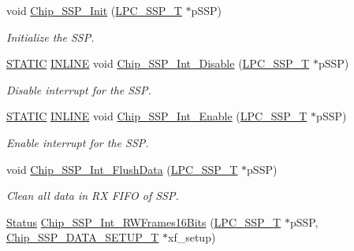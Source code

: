 \begin{DoxyCompactItemize}
void \hyperlink{group__SSP__17XX__40XX_ga66e20405561e8d3dacba65cbfe41d556}{Chip\+\_\+\+S\+S\+P\+\_\+\+Init} (\hyperlink{structLPC__SSP__T}{L\+P\+C\+\_\+\+S\+S\+P\+\_\+T} $\ast$p\+S\+SP)
\begin{DoxyCompactList}\small\item\em Initialize the S\+SP. \end{DoxyCompactList}\item 
\hyperlink{group__LPC__Types__Public__Macros_ga10b2d890d871e1489bb02b7e70d9bdfb}{S\+T\+A\+T\+IC} \hyperlink{group__LPC__Types__Public__Types_ga2eb6f9e0395b47b8d5e3eeae4fe0c116}{I\+N\+L\+I\+NE} void \hyperlink{group__SSP__17XX__40XX_ga20c7c516c84ba924973318bd64c113a3}{Chip\+\_\+\+S\+S\+P\+\_\+\+Int\+\_\+\+Disable} (\hyperlink{structLPC__SSP__T}{L\+P\+C\+\_\+\+S\+S\+P\+\_\+T} $\ast$p\+S\+SP)
\begin{DoxyCompactList}\small\item\em Disable interrupt for the S\+SP. \end{DoxyCompactList}\item 
\hyperlink{group__LPC__Types__Public__Macros_ga10b2d890d871e1489bb02b7e70d9bdfb}{S\+T\+A\+T\+IC} \hyperlink{group__LPC__Types__Public__Types_ga2eb6f9e0395b47b8d5e3eeae4fe0c116}{I\+N\+L\+I\+NE} void \hyperlink{group__SSP__17XX__40XX_ga98eb3a788e313aeb5a4feb2516b11e8f}{Chip\+\_\+\+S\+S\+P\+\_\+\+Int\+\_\+\+Enable} (\hyperlink{structLPC__SSP__T}{L\+P\+C\+\_\+\+S\+S\+P\+\_\+T} $\ast$p\+S\+SP)
\begin{DoxyCompactList}\small\item\em Enable interrupt for the S\+SP. \end{DoxyCompactList}\item 
void \hyperlink{group__SSP__17XX__40XX_gabf29dfba7478866abe7511d32638e57e}{Chip\+\_\+\+S\+S\+P\+\_\+\+Int\+\_\+\+Flush\+Data} (\hyperlink{structLPC__SSP__T}{L\+P\+C\+\_\+\+S\+S\+P\+\_\+T} $\ast$p\+S\+SP)
\begin{DoxyCompactList}\small\item\em Clean all data in RX F\+I\+FO of S\+SP. \end{DoxyCompactList}\item 
\hyperlink{group__LPC__Types__Public__Types_ga67a0db04d321a74b7e7fcfd3f1a3f70b}{Status} \hyperlink{group__SSP__17XX__40XX_gaf97dd891912b8312a1e0989d7a542b7b}{Chip\+\_\+\+S\+S\+P\+\_\+\+Int\+\_\+\+R\+W\+Frames16\+Bits} (\hyperlink{structLPC__SSP__T}{L\+P\+C\+\_\+\+S\+S\+P\+\_\+T} $\ast$p\+S\+SP, \hyperlink{structChip__SSP__DATA__SETUP__T}{Chip\+\_\+\+S\+S\+P\+\_\+\+D\+A\+T\+A\+\_\+\+S\+E\+T\+U\+P\+\_\+T} $\ast$xf\+\_\+setup)

\end{DoxyCompactItemize}

